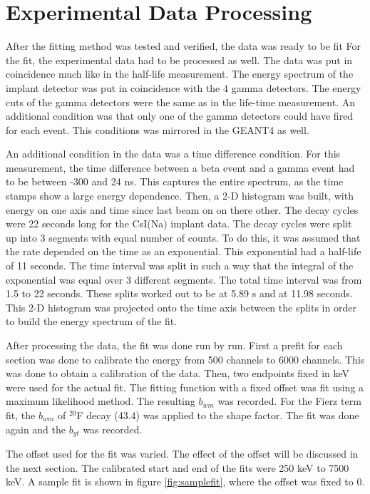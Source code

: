 \documentclass[../MaxHughesThesis.tex]{subfiles}
\begin{document}
\section{Experimental Data Processing}
After the fitting method was tested and verified, the data was ready to be fit 
For the fit, the experimental data had to be processed as well. 
The data was put in coincidence much like in the half-life measurement.
The energy spectrum of the implant detector was put in coincidence with the 4 gamma detectors.
The energy cuts of the gamma detectors were the same as in the life-time measurement.
An additional condition was that only one of the gamma detectors could have fired for each event.
This conditions was mirrored in the GEANT4 as well.

An additional condition in the data was a time difference condition.
For this measurement, the time difference between a beta event and a gamma event had to be between -300 and 24 ns.
This captures the entire spectrum, as the time stamps show a large energy dependence. 
Then, a 2-D histogram was built, with energy on one axis and time since last beam on on there other.
The decay cycles were 22 seconds long for the CsI(Na) implant data. 
The decay cycles were split up into 3 segments with equal number of counts.
To do this, it was assumed that the rate depended on the time as an exponential.
This exponential had a half-life of 11 seconds.
The time interval was split in such a way that the integral of the exponential was equal over 3 different segments.
The total time interval was from 1.5 to 22 seconds.
These splits worked out to be at 5.89 s and at 11.98 seconds. 
This 2-D histogram was projected onto the time axis between the splits in order to build the energy spectrum of the fit. 

After processing the data, the fit was done run by run.
First a prefit for each section was done to calibrate the energy from 500 channels to 6000 channels.
This was done to obtain a calibration of the data.
Then, two endpoints fixed in keV were used for the actual fit.
The fitting function with a fixed offset was fit using a maximum likelihood method.
The resulting $b_{wm}$ was recorded.
For the Fierz term fit, the $b_{wm}$ of $^{20}$F decay (43.4) was applied to the shape factor.
The fit was done again and the $b_{gt}$ was recorded.

The offset used for the fit was varied.
The effect of the offset will be discussed in the next section. 
The calibrated start and end of the fits were 250 keV to 7500 keV. 
A sample fit is shown in figure \ref{fig:samplefit}, where the offset was fixed to 0.
\end{document}
